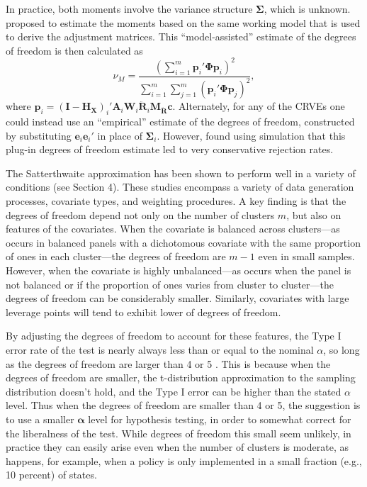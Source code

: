 \documentclass[12pt]{article}
\newcommand{\bm}{\mathbf}
\newcommand{\bs}{\boldsymbol}
\begin{document}
In practice, both moments involve the variance structure $\bs\Sigma$, which is unknown. 
\citet{Bell2002bias} proposed to estimate the moments based on the same working model that is used to derive the adjustment matrices. 
This ``model-assisted'' estimate of the degrees of freedom is then calculated as 
\begin{equation}
\label{eq:nu_model}
\nu_{M} = \frac{\left(\sum_{i=1}^m \bm{p}_i' \bs\Phi \bm{p}_i\right)^2}{\sum_{i=1}^m \sum_{j=1}^m \left(\bm{p}_i' \bs\Phi \bm{p}_j\right)^2},
\end{equation}
where $\bm{p}_i = \left(\bm{I} - \bm{H_X}\right)_i'\bm{A}_i \bm{W}_i\bm{\ddot{R}}_i\bm{M_{\ddot{R}}} \bm{c}$.
\todo{Can we use $\bm{H_{\ddot{U}}}$ here instead?} 
Alternately, for any of the CRVEs one could instead use an ``empirical'' estimate of the degrees of freedom, constructed by substituting $\bm{e}_i \bm{e}_i'$ in place of $\bs\Sigma_i$. 
However, \citet{Bell2002bias} found using simulation that this plug-in degrees of freedom estimate led to very conservative rejection rates. 

The \citet{Bell2002bias} Satterthwaite approximation has been shown to perform well in a variety of conditions (see Section 4). 
These studies encompass a variety of data generation processes, covariate types, and weighting procedures. 
A key finding is that the degrees of freedom depend not only on the number of clusters $m$, but also on features of the covariates. 
When the covariate is balanced across clusters---as occurs in balanced panels with a dichotomous covariate with the same proportion of ones in each cluster---the degrees of freedom are $m - 1$ even in small samples. 
However, when the covariate is highly unbalanced---as occurs when the panel is not balanced or if the proportion of ones varies from cluster to cluster---the degrees of freedom can be considerably smaller. 
Similarly, covariates with large leverage points will tend to exhibit lower of degrees of freedom. 

By adjusting the degrees of freedom to account for these features, the Type I error rate of the test is nearly always less than or equal to the nominal $\alpha$, so long as the degrees of freedom are larger than 4 or 5 \citep{Bell2002bias, Tipton2015small-t}.
This is because when the degrees of freedom are smaller, the t-distribution approximation to the sampling distribution doesn't hold, and the Type I error can be higher than the stated $\alpha$ level.
Thus when the degrees of freedom are smaller than 4 or 5, the suggestion is to use a smaller $\bs\alpha$ level for hypothesis testing, in order to somewhat correct for the liberalness of the test. 
While degrees of freedom this small seem unlikely, in practice they can easily arise even when the number of clusters is moderate, as happens, for example, when a policy is only implemented in a small fraction (e.g., 10 percent) of states. 
\end{document}
